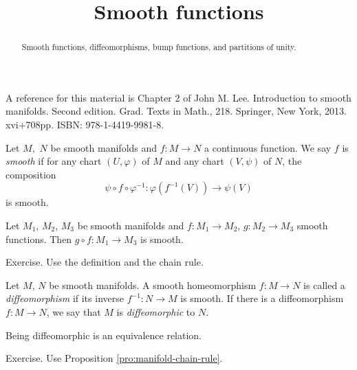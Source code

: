 \documentclass{ximera}
\title{Smooth functions}
\begin{document}
 
    \begin{abstract} Smooth functions, diffeomorphisms,  bump functions, and partitions of unity.    \end{abstract}
    \maketitle

    A reference for this material is Chapter 2 of John M. Lee. Introduction to smooth manifolds. Second edition. Grad. Texts in Math., 218. Springer, New York, 2013. xvi+708pp. ISBN: 978-1-4419-9981-8.

    \begin{definition}
        Let $M,$ $N$ be smooth manifolds and $f : M \to N$ a continuous function. We say $f$ is \emph{smooth} if for any chart $(U, \varphi)$ of $M$ and any chart $(V, \psi)$ of $N$, the composition 
        \[      \psi \circ f \circ \varphi ^{-1} : \varphi ( f^{-1} (V) ) \to \psi (V)                  \]
        is smooth. 
    \end{definition}

    \begin{proposition}\label{pro:manifold-chain-rule}
        Let $M_1$, $M_2$, $M_3$ be smooth manifolds and $f:M_1 \to M_2 $, $g : M_2 \to M_3$ smooth functions. Then $g \circ f : M_1 \to M_3$ is smooth. 


        
    \begin{solution}
     Exercise.    Use the definition and the chain rule.  
       \end{solution}
    \end{proposition}

     

    \begin{definition}[Diffeomorphism]
        Let $M$, $N$ be smooth manifolds. A smooth homeomorphism $f : M \to N$ is called a \emph{diffeomorphism} if its inverse $f^{-1} : N \to M$ is smooth. If there is a diffeomorphism $f : M \to N$, we say that $M$ is \emph{diffeomorphic} to $N$.   
    \end{definition}


    \begin{proposition}
        Being diffeomorphic is an equivalence relation. 

        

    \begin{solution}
        Exercise. Use Proposition \ref{pro:manifold-chain-rule}.
    \end{solution}
    \end{proposition}
\end{document}
